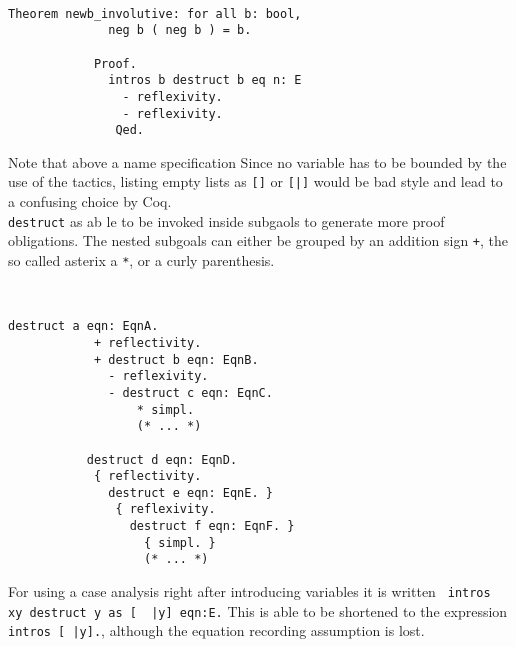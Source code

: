 		\begin{example} ~\\\vspace{-10mm}
		  \begin{lstlisting}[caption=\lstinline!newb_invloutive!]
		  	Theorem newb_involutive: for all b: bool,
		  	  neg b ( neg b ) = b.
		  	  
		  	Proof. 
		  	  intros b destruct b eq n: E
		  	    - reflexivity. 
		  	    - reflexivity. 
		  	   Qed.  
		  \end{lstlisting}
		\end{example}	 
		 Note that above a name specification %
		 Since no variable has to be bounded by the use of the tactics, listing empty lists as \lstinline![]! or \lstinline![|]! would be bad style and lead to a confusing choice by Coq.\\	 
		 \lstinline!destruct! as ab le to be invoked inside subgaols to generate more proof obligations.
		  The nested subgoals can either be grouped by an addition sign \lstinline!+!, the so called asterix a \lstinline!*!, or a curly parenthesis.
		  \begin{example} ~\\\vspace{-10mm}
		  \begin{lstlisting}[caption = syntax of nested \lstinline!destruct! expressions]
		  destruct a eqn: EqnA.
		    + reflectivity.
		    + destruct b eqn: EqnB.
		      - reflexivity.
		      - destruct c eqn: EqnC.
		          * simpl. 
		          (* ... *)       
		  
		   destruct d eqn: EqnD.
		    { reflectivity.
		      destruct e eqn: EqnE. } 
		       { reflexivity.
		         destruct f eqn: EqnF. } 
		           { simpl. }
		           (* ... *)   
		   \end{lstlisting}
		   \end{example}	 
		  For using a case analysis right after introducing variables it is written
		  \lstinline! intros xy destruct y as [  |y] eqn:E.!	
		  This is able to be shortened to the expression \lstinline! intros [ |y].!, although the equation recording assumption is lost.   
	    
   
   
   